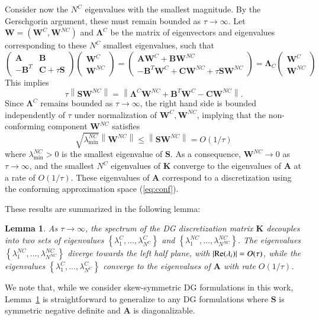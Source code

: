 \documentclass[preprint,10pt]{elsarticle}
\newcommand{\nor}[1]{\left\| #1 \right\|}
\newcommand{\LRb}[1]{\left| #1 \right|}
\newcommand{\LRc}[1]{\left\{ #1 \right\}}
\newtheorem{lemma}[theorem]{Lemma}
\begin{document}
Consider now the $N^C$ eigenvalues with the smallest magnitude.  By the Gerschgorin argument, these must remain bounded as $\tau \rightarrow \infty$.  Let $\bm{W} = (\bm{W}^C,\bm{W}^{NC})$ and $\bm{\Lambda}^C$ be the matrix of eigenvectors and eigenvalues corresponding to these $N^C$ smallest eigenvalues, such that
\[
\left(\begin{array}{cc}
\bm{A} & \bm{B}\\
-\bm{B}^T & \bm{C} + \tau \bm{S}
\end{array}\right)
\left(\begin{array}{c}
\bm{W}^C
\\
\bm{W}^{NC}
\end{array}\right) = 
\left(\begin{array}{c}
\bm{A}\bm{W}^C + \bm{B}\bm{W}^{NC}\\
-\bm{B}^T\bm{W}^C + \bm{C}\bm{W}^{NC} + \tau \bm{S}\bm{W}^{NC}
\end{array}\right)
= 
\bm{\Lambda}_C
\left(\begin{array}{c}
\bm{W}^C
\\
\bm{W}^{NC}
\end{array}\right) 
\]
This implies 
\[
\tau \nor{\bm{S}\bm{W}^{NC}} = \nor{\bm{\Lambda}^C \bm{W}^{NC} + \bm{B}^T\bm{W}^C  - \bm{C}\bm{W}^{NC}}.
\]
Since $\bm{\Lambda}^C$ remains bounded as $\tau\rightarrow \infty$, the right hand side is bounded independently of $\tau$ under normalization of $\bm{W}^C,\bm{W}^{NC}$, implying that the non-conforming component $\bm{W}^{NC}$ satisfies
\[
\sqrt{\lambda^{NC}_{\min}}\nor{\bm{W}^{NC}} \leq \nor{\bm{S}\bm{W}^{NC}} = O(1/\tau)
\]
where $\lambda^{NC}_{\min} > 0$ is the smallest eigenvalue of $\bm{S}$.  As a consequence, $\bm{W}^{NC} \rightarrow 0$ as $\tau\rightarrow \infty$, and the smallest $N^C$ eigenvalues of $\bm{K}$ converge to the eigenvalues of $\bm{A}$ at a rate of $O(1/\tau)$.  These eigenvalues of $\bm{A}$ correspond to a discretization using the conforming approximation space (\ref{eq:conf}). 

These results are summarized in the following lemma:
\begin{lemma}
As $\tau \rightarrow \infty$, the spectrum of the DG discretization matrix $\bm{K}$ decouples into two sets of eigenvalues $\LRc{\lambda^C_1,\ldots,\lambda^C_{N^C}}$ and $\LRc{\lambda^{NC}_1,\ldots,\lambda^{NC}_{N^{NC}}}$.  The eigenvalues $\LRc{\lambda^{NC}_1,\ldots,\lambda^{NC}_{N^{NC}}}$ diverge towards the left half plane, with $\LRb{{\rm Re}(\lambda_i)} = O(\tau)$, while the eigenvalues $\LRc{\lambda^C_1,\ldots,\lambda^C_{N^C}}$ converge to the eigenvalues of $\bm{A}$ with rate $O(1/\tau)$.  
\label{lemma:eig}
\end{lemma}
We note that, while we consider skew-symmetric DG formulations in this work, Lemma~\ref{lemma:eig} is straightforward to generalize to any DG formulations where $\bm{S}$ is symmetric negative definite and $\bm{A}$ is diagonalizable.  
\end{document}
